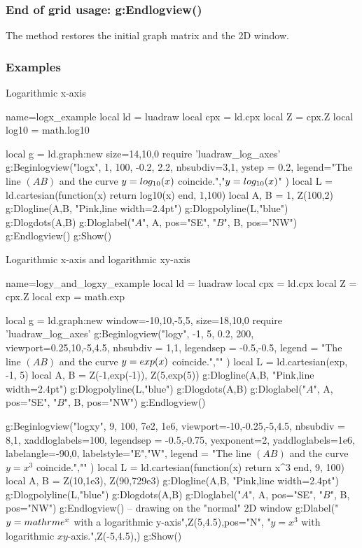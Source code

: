 \subsubsection{End of grid usage: g:Endlogview()}

The  method restores the initial graph matrix and the 2D window.

\subsubsection{Examples}

\begin{demo}{Logarithmic x-axis}
\begin{luadraw}{name=logx_example}
local ld = luadraw
local cpx = ld.cpx
local Z = cpx.Z
local log10 = math.log10

local g = ld.graph:new{ size={14,10,0} }
require 'luadraw_log_axes'
g:Beginlogview("logx", 1, 100, -0.2, 2.2, {
   nbsubdiv={3,1},
   ystep = 0.2,
   legend={"The line $(AB)$ and the curve $y=\\log_{10}(x)$ coincide.","$y=\\log_{10}(x)$"}
})
local L = ld.cartesian(function(x) return log10(x) end, 1,100)
local A, B = 1, Z(100,2)
g:Dlogline(A,B, "Pink,line width=2.4pt")
g:Dlogpolyline(L,"blue") 
g:Dlogdots({A,B})
g:Dloglabel("$A$", A, {pos="SE"}, "$B$", B, {pos="NW"})
g:Endlogview()
g:Show()
\end{luadraw}
\end{demo}   


\begin{demo}{Logarithmic x-axis and logarithmic xy-axis}
\begin{luadraw}{name=logy_and_logxy_example}
local ld = luadraw
local cpx = ld.cpx
local Z = cpx.Z
local  exp = math.exp

local g = ld.graph:new{ window={-10,10,-5,5}, size={18,10,0} }
require 'luadraw_log_axes'
g:Beginlogview("logy", -1, 5, 0.2, 200, { viewport={0.25,10,-5,4.5},
    nbsubdiv = {1,1},
    legendsep = {-0.5,-0.5},
    legend = {"The line $(AB)$ and the curve $y=\\exp(x)$ coincide.",""}
})
local L = ld.cartesian(exp, -1, 5)
local A, B = Z(-1,exp(-1)), Z(5,exp(5))
g:Dlogline(A,B, "Pink,line width=2.4pt")
g:Dlogpolyline(L,"blue") 
g:Dlogdots({A,B})
g:Dloglabel("$A$", A, {pos="SE"}, "$B$", B, {pos="NW"})
g:Endlogview()

g:Beginlogview("logxy", 9, 100, 7e2, 1e6, { viewport={-10,-0.25,-5,4.5},
    nbsubdiv = {8,1},
    xaddloglabels={100},
    legendsep = {-0.5,-0.75},
    yexponent=2,
    yaddloglabels={1e6}, 
    labelangle={-90,0}, labelstyle={"E","W"},
    legend = {"The line $(AB)$ and the curve $y=x^3$ coincide.",""}
})
local L = ld.cartesian(function(x) return x^3 end, 9, 100)
local A, B = Z(10,1e3), Z(90,729e3)
g:Dlogline(A,B, "Pink,line width=2.4pt")
g:Dlogpolyline(L,"blue") 
g:Dlogdots({A,B})
g:Dloglabel("$A$", A, {pos="SE"}, "$B$", B, {pos="NW"})
g:Endlogview()
-- drawing on the "normal" 2D window
g:Dlabel("$y=\\mathrm{e}^x$ with a logarithmic y-axis",Z(5,4.5),{pos="N"},
  "$y=x^3$ with logarithmic $xy$-axis.",Z(-5,4.5),{})
g:Show()
\end{luadraw}
\end{demo}
